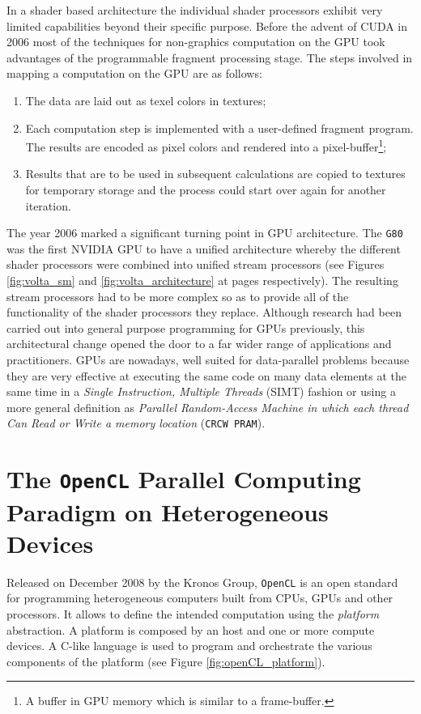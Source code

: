 \begin{description}
    In a shader based architecture the individual shader processors exhibit very limited capabilities beyond their specific purpose.
    Before the advent of CUDA in 2006 most of the techniques for non-graphics
    computation on the GPU took advantages of the programmable fragment processing stage. The steps involved in mapping a computation on the GPU are
    as follows:
    \begin{enumerate}
    	\item The data are laid out as texel colors in textures;
    	\item  Each computation step is implemented with a
    	user-defined fragment program. The results are encoded as pixel colors and rendered into a  pixel-buffer\footnote{ A buffer in GPU memory which is similar to a frame-buffer.}; 
    	\item Results that are
    	to be used in subsequent calculations are copied to textures for temporary storage and the process could start over again for another iteration.
    \end{enumerate} 
    
    The year 2006 marked a significant turning point in GPU architecture. The \texttt{G80}  was the first \textsc{NVIDIA} GPU to have a unified architecture whereby the different shader processors were  combined into unified stream processors (see Figures \ref{fig:volta_sm} and \ref{fig:volta_architecture} at pages \pageref{fig:volta_sm}  \pageref{fig:volta_architecture} respectively). The resulting stream processors had to be more complex so as to provide all of the functionality of the shader processors they replace. Although research had been carried out into general purpose programming
    for GPUs previously, this architectural change opened the door to a far wider range of  applications and practitioners.
    GPUs are nowadays, well suited for data-parallel problems because they are very effective at executing the same code on many data elements at the same time  in a \textit{Single Instruction, Multiple Threads} (SIMT) fashion or using a more general definition as \textit{Parallel Random-Access Machine in which each thread Can Read or Write a memory location} (\texttt{CRCW PRAM}).
    
    
    \section{The \texttt{OpenCL} Parallel Computing Paradigm on Heterogeneous Devices}
    Released on December 2008 by the Kronos Group, \texttt{OpenCL} \cite{Gaster:2011:HCO:2046379,Stone:2010:OPP:622179.1803953,Munshi:2011:OPG:2049883} is an open standard for programming heterogeneous computers built from CPUs, GPUs and other processors. It allows to define the intended computation using the \textit{platform} abstraction. A platform is composed by an host and one or more compute devices. A C-like language is used to program and orchestrate the various components of the platform (see Figure \ref{fig:openCL_platform}).
    

\end{description}
